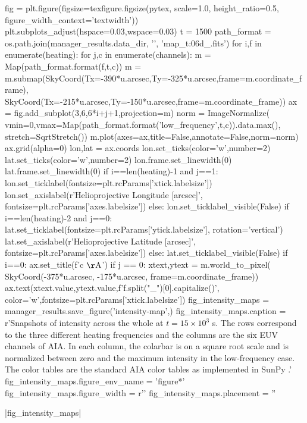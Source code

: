 \begin{pycode}
fig = plt.figure(figsize=texfigure.figsize(pytex, scale=1.0, height_ratio=0.5, 
                                           figure_width_context='textwidth'))
plt.subplots_adjust(hspace=0.03,wspace=0.03)
t = 1500
path_format = os.path.join(manager_results.data_dir, '{}', 'map_t{:06d}_{}.fits')
for i,f in enumerate(heating):
    for j,c in enumerate(channels):
        m = Map(path_format.format(f,t,c))
        m = m.submap(SkyCoord(Tx=-390*u.arcsec,Ty=-325*u.arcsec,frame=m.coordinate_frame),
                     SkyCoord(Tx=-215*u.arcsec,Ty=-150*u.arcsec,frame=m.coordinate_frame))
        ax = fig.add_subplot(3,6,6*i+j+1,projection=m)
        norm = ImageNormalize(
            vmin=0,vmax=Map(path_format.format('low_frequency',t,c)).data.max(),
            stretch=SqrtStretch())
        m.plot(axes=ax,title=False,annotate=False,norm=norm)
        ax.grid(alpha=0)
        lon,lat = ax.coords
        lon.set_ticks(color='w',number=2)
        lat.set_ticks(color='w',number=2)
        lon.frame.set_linewidth(0)
        lat.frame.set_linewidth(0)
        if i==len(heating)-1 and j==1:
            lon.set_ticklabel(fontsize=plt.rcParams['xtick.labelsize'])
            lon.set_axislabel(r'Helioprojective Longitude [arcsec]',
                                fontsize=plt.rcParams['axes.labelsize'])
        else:
            lon.set_ticklabel_visible(False)
        if i==len(heating)-2 and j==0:
            lat.set_ticklabel(fontsize=plt.rcParams['ytick.labelsize'], rotation='vertical')
            lat.set_axislabel(r'Helioprojective Latitude [arcsec]',
                                fontsize=plt.rcParams['axes.labelsize'])
        else:
            lat.set_ticklabel_visible(False)
        if i==0:
            ax.set_title(f'{c} $\mathrm{{\AA}}$')
        if j == 0:
            xtext,ytext = m.world_to_pixel(
                SkyCoord(-375*u.arcsec, -175*u.arcsec, frame=m.coordinate_frame))
            ax.text(xtext.value,ytext.value,f'{f.split("_")[0].capitalize()}',
                    color='w',fontsize=plt.rcParams['xtick.labelsize'])
fig_intensity_maps = manager_results.save_figure('intensity-map',)
fig_intensity_maps.caption = r'Snapshots of intensity across the whole \AR{} at $t=15\times10^3$ s. The rows correspond to the three different heating frequencies and the columns are the six EUV channels of AIA. In each column, the colarbar is on a square root scale and is normalized between zero and the maximum intensity in the low-frequency case. The color tables are the standard AIA color tables as implemented in SunPy \citep{sunpy_community_sunpypython_2015}.'
fig_intensity_maps.figure_env_name = 'figure*'
fig_intensity_maps.figure_width = r'\textwidth'
fig_intensity_maps.placement = ''
\end{pycode}
|fig_intensity_maps|

